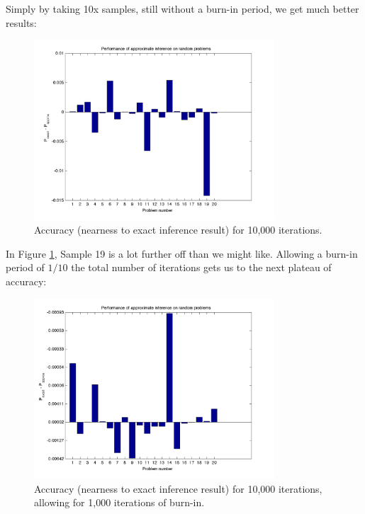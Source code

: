 \documentclass[11pt]{report}
\begin{document}
\noindent Simply by taking 10x samples, still without a burn-in period, we get much better results:

\begin{figure}[H]
  \centering
  \includegraphics[width=0.8\textwidth]{hw6-plot-n10000.png}
  \caption{Accuracy (nearness to exact inference result) for 10,000 iterations.}
  \label{fig:n10000}
\end{figure}

\noindent In Figure \ref{fig:n10000}, Sample 19 is a lot further off than we might like. Allowing a burn-in period of $1/10$ the total number of iterations gets us to the next plateau of accuracy:

\begin{figure}[H]
  \centering
  \includegraphics[width=0.8\textwidth]{hw6-plot-n10000-burnin.png}
  \caption{Accuracy (nearness to exact inference result) for 10,000 iterations, allowing for 1,000 iterations of burn-in.}
  \label{fig:n10000-burnin}
\end{figure}
\end{document}
